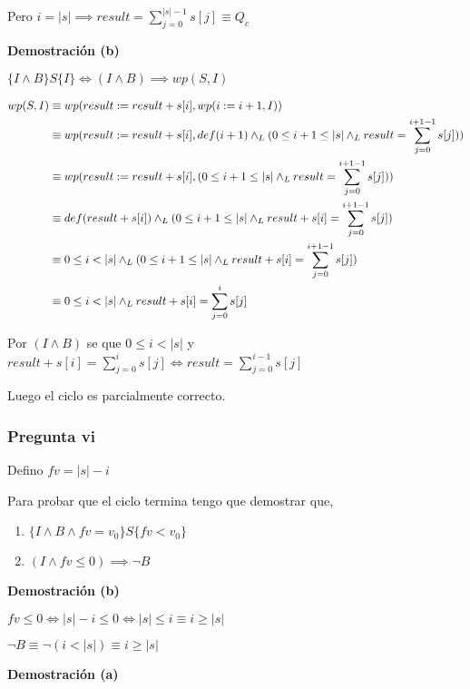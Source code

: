Pero $ i = |s| \implies result = \sum_{j = 0}^{|s| - 1}s[j] \equiv Q_c $

\textbf{Demostración (b)}

$ \{ I \wedge B \} S \{ I \} \iff (I \wedge B) \implies wp(S, I) $

\begin{align*}
    wp(S, I) &\equiv wp(result := result + s[i], wp(i := i+1, I)) \\
    &\equiv wp(result := result + s[i], def(i+1) \land _L (0 \leq i + 1 \leq |s| \land _L result = \sum_{j = 0}^{i + 1 - 1}s[j])) \\
    &\equiv wp(result := result + s[i], (0 \leq i + 1 \leq |s| \land _L result = \sum_{j = 0}^{i + 1 - 1}s[j])) \\
    &\equiv def(result + s[i]) \land _L (0 \leq i + 1 \leq |s| \land _L result + s[i] = \sum_{j = 0}^{i + 1 - 1}s[j]) \\
    &\equiv 0 \leq i < |s| \land _L (0 \leq i + 1 \leq |s| \land _L result + s[i] = \sum_{j = 0}^{i + 1 - 1}s[j]) \\
    &\equiv 0 \leq i < |s| \land _L result + s[i] = \sum_{j = 0}^{i}s[j] \\
\end{align*}

Por $(I \wedge B)$ se que $ 0 \leq i < |s| $ y $ result + s[i] = \sum_{j = 0}^{i}s[j] \iff result = \sum_{j = 0}^{i-1}s[j] $

Luego el ciclo es parcialmente correcto.

\subsubsection{Pregunta vi}

Defino $ fv = |s| - i $

Para probar que el ciclo termina tengo que demostrar que,
\begin{enumerate}[label=(\alph*)]
    \item $ \{ I \wedge B \wedge fv = v_0 \} S \{ fv < v_0 \} $
    \item $ (I \wedge fv \leq 0) \implies \neg B $
\end{enumerate}

\textbf{Demostración (b)}

$ fv \leq 0 \iff |s| - i \leq 0 \iff |s| \leq i \equiv i \geq |s| $

$ \neg B \equiv \neg (i < |s|) \equiv i \geq |s| $

\textbf{Demostración (a)}

